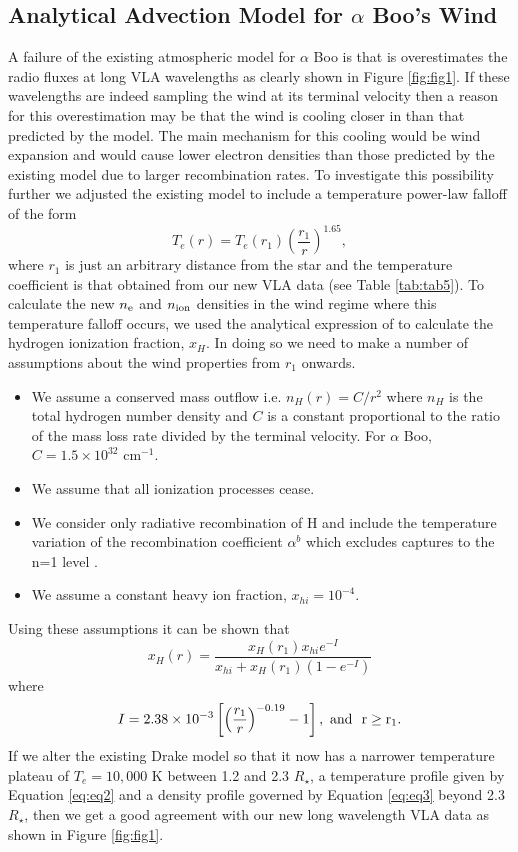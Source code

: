\documentclass[iop]{emulateapj}
\begin{document}
\subsection{Analytical Advection Model for $\alpha$ Boo's Wind} \label{disc4}
A failure of the existing atmospheric model for $\alpha$ Boo is that is overestimates the radio fluxes at long VLA wavelengths as clearly shown in Figure \ref{fig:fig1}. If these wavelengths are indeed sampling the wind at its terminal velocity then a reason for this overestimation may be that the wind is cooling closer in than that predicted by the model. The main mechanism for this cooling would be wind expansion \citep{2011ASPC..448..691O} and would cause lower electron densities than those predicted by the existing model due to larger recombination rates. To investigate this possibility further we adjusted the existing model to include a temperature power-law falloff of the form
\begin{equation}
T_{e}(r)= T_{e}(r_{1})\left(\frac{r_{1}}{r}\right)^{1.65},
\label{eq:eq2}
\end{equation}
where $r_{1}$ is just an arbitrary distance from the star and the temperature coefficient is that obtained from our new VLA data (see Table \ref{tab:tab5}). To calculate the new $n_{\rm{e}}$ and $n_{\rm{ion}}$ densities in the wind regime where this temperature falloff occurs, we used the analytical expression of \cite{1986ApJ...306..605G} to calculate the hydrogen ionization fraction, $x_H$. In doing so we need to make a number of assumptions about the wind properties from $r_{1}$ onwards.
\begin{itemize}
\item We assume a conserved mass outflow i.e. $n_{H}(r)=C/r^2$ where $n_{H}$ is the total hydrogen number density and $C$ is a constant proportional to the ratio of the mass loss rate divided by the terminal velocity. For $\alpha$ Boo, $C = 1.5 \times 10^{32} $ cm$^{-1}$.
\item We assume that all ionization processes cease.
\item We consider only radiative recombination of H and include the temperature variation of the recombination coefficient $\alpha ^{b}$ which excludes captures to the n=1 level \citep{1978ppim.book.....S}.
\item We assume a constant heavy ion fraction, $x_{hi}=10^{-4}$.
\end{itemize}
Using these assumptions it can be shown that 
\begin{equation}
x_H(r)= \frac{x_{H}(r_1)x_{hi}e^{-I}}{x_{hi}+x_{H}(r_1)(1 - e^{-I})}
\label{eq:eq3}
\end{equation}
where
\begin{equation}
I = 2.38 \times 10^{-3} \left[\left( \frac{r_{1}}{r}\right)^{-0.19} -1 \right], \ \rm{and} \ \  r \geq r_{1}.
\label{eq:eq4}
\end{equation}
If we alter the existing Drake model so that it now has a narrower temperature  plateau of $T_e = 10,000$ K between 1.2 and 2.3 $R_{\star}$, a temperature profile given by Equation \ref{eq:eq2} and a density profile governed by Equation \ref{eq:eq3} beyond 2.3 $R_{\star}$, then we get a  good agreement with our new long wavelength VLA data as shown in Figure \ref{fig:fig1}.
\end{document}

